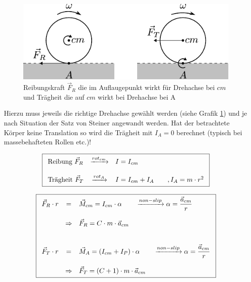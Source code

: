 \begin{figure}[h!]
	\centering
	\includegraphics[scale=0.8]{non-slip-kraft.pdf}
	\caption{Reibungskraft $\vec{F}_R$ die im Auflaugepunkt 
		wirkt für Drehachse bei $cm$ und 
		Trägheit die auf $cm$ wirkt bei Drehachse bei A}
	\label{fig:non-slip-kraft}
\end{figure}

\noindent
Hierzu muss jeweils die richtige Drehachse gewählt werden (siehe
Grafik \ref{fig:non-slip-kraft}) und je nach Situation der Satz von
Steiner angewandt werden. Hat der betrachtete Körper keine Translation
so wird die Trägheit mit $I_A=0$ berechnet (typisch bei 
massebehafteten Rollen etc.)!

\[ \boxed{\begin{array}{l c l}
	\text{Reibung } \vec{F}_R 
		& \xrightarrow{rot_{cm}}
		& I = I_{cm} \\
	 & & \\
	\text{Trägheit } \vec{F}_T 
		& \xrightarrow{rot_A}
		& I = I_{cm} + I_A \qquad,I_A = m \cdot r^2
\end{array}}\]

\[ \boxed{\begin{array}{c c l}
	\vec{F}_R \cdot r 
		& =
		& \vec{M}_{cm} = I_{cm} \cdot \alpha 
		\qquad \xrightarrow{non-slip} 
			\displaystyle
			\alpha = \frac{\vec{a}_{cm}}{r} \\
	& & \\
		& \Rightarrow 
		& \vec{F}_R = C \cdot m \cdot \vec{a}_{cm} \\
	& & \\
	& & \\
	\vec{F}_T \cdot r 
		& = 
		& \vec{M}_{A} = (I_{cm} + I_P) \cdot \alpha
		\qquad \xrightarrow{non-slip}
			\displaystyle
			\alpha = \frac{\vec{a}_{cm}}{r} \\
	& & \\
		& \Rightarrow 
		& \vec{F}_T = (C + 1) \cdot m \cdot \vec{a}_{cm}
\end{array} } \]

